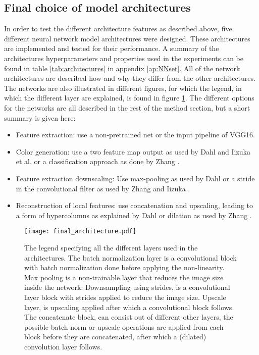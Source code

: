 \subsection{Final choice of model architectures}
In order to test the different architecture features as described above, five different neural network model architectures were designed. These architectures are implemented and tested for their performance. A summary of the architectures hyperparameters and properties used in the experiments can be found in table \ref{tab:architectures} in appendix \ref{ap:NNset}. All of the network architectures are described how and why they differ from the other architectures. The networks are also illustrated in different figures, for which the legend, in which the different layer are explained, is found in figure \ref{fig:Legend}.
The different options for the networks are all described in the rest of the method section, but a short summary is given here:\\

\begin{itemize}
	\item Feature extraction: use a non-pretrained net or the input pipeline of VGG16.
	\item Color generation: use a two feature map output as used by Dahl \cite{Dahl} and Iizuka et al. \cite{IizukaSIGGRAPH2016} or a classification approach as done by Zhang \cite{Zhang}.
	\item Feature extraction downscaling: Use max-pooling as used by Dahl \cite{Dahl} or a stride in the convolutional filter as used by Zhang and Iizuka \cite{Zhang}\cite{IizukaSIGGRAPH2016}.
	\item Reconstruction of local features: use concatenation and upscaling, leading to a form of hypercolumns as explained by Dahl \cite{Dahl} or dilation as used by Zhang \cite{Zhang}.
\end{itemize}

\begin{figure}[h!]
	\centering
	\texttt{[image: final\_architecture.pdf]}
	\caption{The legend specifying all the different layers used in the architectures. The batch normalization layer is a convolutional block with batch normalization done before applying the non-linearity. Max pooling is a non-trainable layer that reduces the image size inside the network. Downsampling using strides, is a convolutional layer block with strides applied to reduce the image size. Upscale layer, is upscaling applied after which a convolutional block follows. The concatenate block, can consist out of different other layers, the possible batch norm or upscale operations are applied from each block before they are concatenated, after which a (dilated) convolution layer follows.}
	\label{fig:Legend}
\end{figure}

